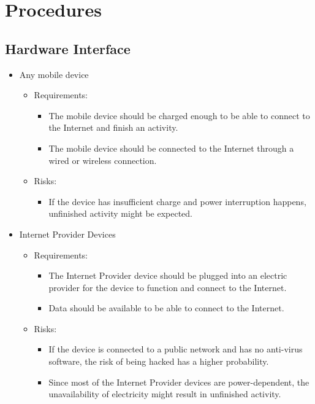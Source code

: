 \newpage

\section{Procedures}


\subsection{Hardware Interface}
\begin{itemize}
\item Any mobile device 
	\begin{itemize}
	\item Requirements: 
		\begin{itemize}
		\item The mobile device should be charged enough to be able to connect to the Internet and finish an activity. 
		\item The mobile device should be connected to the Internet through a wired or wireless connection. 
		\end{itemize}
	\item Risks:
		\begin{itemize}
		\item If the device has insufficient charge and power interruption happens, unfinished activity might be expected. 
		\end{itemize}
	\end{itemize}
\item Internet Provider Devices 
	\begin{itemize}
	\item Requirements: 
		\begin{itemize}
		\item The Internet Provider device should be plugged into an electric provider for the device to function and connect to the Internet. 
		\item Data should be available to be able to connect to the Internet. 
		\end{itemize}
	\item Risks:
		\begin{itemize}
		\item If the device is connected to a public network and has no anti-virus software, the risk of being hacked has a higher probability. 
		\item Since most of the Internet Provider devices are power-dependent, the unavailability of electricity might result in unfinished activity. 
		\end{itemize}
	\end{itemize}
\end{itemize}

